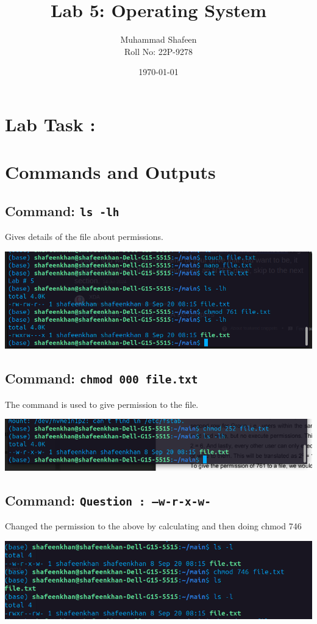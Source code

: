 \documentclass[a4paper,12pt]{article}
\title{Lab 5: Operating System}
\author{Muhammad Shafeen \\ Roll No: 22P-9278}
\date{\today}
\begin{document}
\maketitle

\section*{Lab Task :}

\section{Commands and Outputs}
\subsection{Command: \texttt{ls -lh}}
Gives details of the file about permissions.
\begin{center}
    \includegraphics[width=\linewidth]{Screenshot from 2024-09-20 08-19-19.png}
\end{center}

\subsection{Command: \texttt{chmod 000 file.txt}}
The command is used to give permission to the file.
\begin{center}
    \includegraphics[width=\linewidth]{Screenshot from 2024-09-20 08-31-20.png}
\end{center}

\subsection{Command: \texttt{Question : --w-r-x-w-}}
Changed the permission to the above by calculating and then doing chmod 746
\begin{center}
    \includegraphics[width=\linewidth]{Screenshot from 2024-09-20 08-55-46.png}
\end{center}
\end{document}
